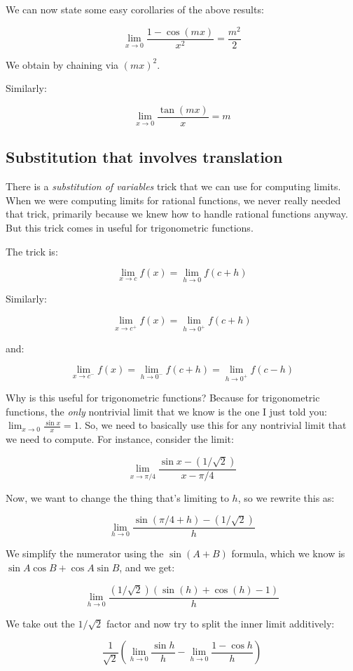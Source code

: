 \documentclass[10pt]{amsart}
\begin{document}
We can now state some easy corollaries of the above results:

$$\lim_{x \to 0} \frac{1 - \cos(mx)}{x^2} = \frac{m^2}{2}$$

We obtain by chaining via $(mx)^2$.

Similarly:

$$\lim_{x \to 0} \frac{\tan(mx)}{x} = m$$

\subsection{Substitution that involves translation}

There is a {\em substitution of variables} trick that we can use for
computing limits. When we were computing limits for rational
functions, we never really needed that trick, primarily because we
knew how to handle rational functions anyway. But this trick comes in
useful for trigonometric functions. 

The trick is:

$$\lim_{x \to c} f(x) = \lim_{h \to 0} f(c + h)$$

Similarly:

$$\lim_{x \to c^+} f(x) = \lim_{h \to 0^+} f(c + h)$$

and:

$$\lim_{x \to c^-} f(x) = \lim_{h \to 0^-} f(c + h) = \lim_{h \to 0^+} f(c - h)$$

Why is this useful for trigonometric functions? Because for
trigonometric functions, the {\em only} nontrivial limit that we know
is the one I just told you: $\lim_{x \to 0} \frac{\sin x}{x} = 1$. So,
we need to basically use this for any nontrivial limit that we need to
compute. For instance, consider the limit:

$$\lim_{x \to \pi/4} \frac{\sin x - (1/\sqrt{2})}{x - \pi/4}$$

Now, we want to change the thing that's limiting to $h$, so we rewrite
this as:

$$\lim_{h \to 0} \frac{\sin(\pi/4 + h) - (1/\sqrt{2})}{h}$$

We simplify the numerator using the $\sin(A + B)$ formula, which we
know is $\sin A \cos B + \cos A \sin B$, and we get:

$$\lim_{h \to 0} \frac{(1/\sqrt{2})(\sin(h) + \cos(h) - 1)}{h}$$

We take out the $1/\sqrt{2}$ factor and now try to split the inner
limit additively:

$$\frac{1}{\sqrt{2}}\left( \lim_{h \to 0} \frac{\sin h}{h} - \lim_{h \to 0} \frac{1 - \cos h}{h} \right)$$
\end{document}
